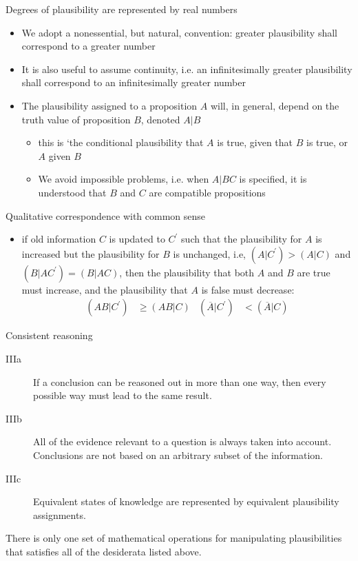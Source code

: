\documentclass[9pt, letterpaper]{article}
\begin{document}
\begin{description}
    \item[I] Degrees of plausibility are represented by real numbers
        \begin{itemize}
            \item{We adopt a nonessential, but natural, convention: greater plausibility shall correspond to a greater number}
            \item{It is also useful to assume continuity, i.e. an infinitesimally greater plausibility shall correspond to an infinitesimally greater number}
            \item{The plausibility assigned to a proposition $A$ will, in general, depend on the truth value of proposition $B$, denoted $A|B$}
                \begin{itemize}
                    \item{this is `the conditional plausibility that $A$ is true, given that $B$ is true, or $A$ given $B$}
                    \item{We avoid impossible problems, i.e. when $A|BC$ is specified, it is understood that $B$ and $C$ are compatible propositions}
                \end{itemize}
        \end{itemize}
    \item[II] Qualitative correspondence with common sense
        \begin{itemize}
            \item{if old information $C$ is updated to $C^\prime$ such that the plausibility for $A$ is increased but the plausibility for $B$ is unchanged, i.e, $\left(A|C^\prime \right) > \left(A|C \right)$ and $\left(B|AC^\prime \right) = \left(B|AC \right)$, then the plausibility that both $A$ and $B$ are true must increase, and the plausibility that $A$ is false must decrease:}
                \begin{align*}
                    \left(AB|C^\prime \right) & \geq \left(AB|C \right) & \left(\overline{A} | C^\prime \right) &< \left(\overline{A}| C \right)
                \end{align*}
        \end{itemize}
    \item[III] Consistent reasoning
        \begin{description}
            \item[IIIa] If a conclusion can be reasoned out in more than one way, then every possible way must lead to the same result.
            \item[IIIb] All of the evidence relevant to a question is always taken into account. Conclusions are not based on an arbitrary subset of the information.
            \item[IIIc] Equivalent states of knowledge are represented by equivalent plausibility assignments.
        \end{description}
    \item{There is only one set of mathematical operations for manipulating plausibilities that satisfies all of the desiderata listed above.}
\end{description}
\end{document}
